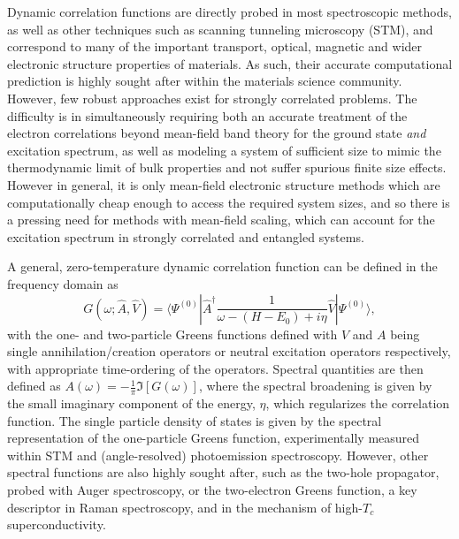 \documentclass[aps,showpacs,twocolumn,nobibnotes]{revtex4}
\begin{document}
Dynamic correlation functions are directly probed in most spectroscopic methods, as well as other techniques such as scanning tunneling microscopy (STM), 
and correspond to many of the important transport, optical, magnetic and wider electronic structure properties of materials. 
As such, their accurate computational prediction is highly sought after within the materials science community. 
However, few robust approaches exist for strongly correlated problems\cite{Gali2013}. The difficulty is in simultaneously requiring both an accurate 
treatment of the electron correlations beyond mean-field band theory for the ground state {\em and} excitation spectrum, as well as modeling 
a system of sufficient size to mimic the thermodynamic limit of bulk properties and not suffer spurious finite size effects. 
However in general, it is only mean-field electronic structure methods which are computationally cheap enough to access the required system
sizes, and so there is a pressing need for methods with mean-field scaling, which can account for the excitation spectrum in strongly correlated 
and entangled systems.

A general, zero-temperature dynamic correlation function can be defined in the frequency domain as
\begin{equation}
    G(\omega;{\hat A},{\hat V}) = \langle \Psi^{(0)} | {\hat A}^{\dagger} \frac{1}{\omega-(H-E_0)+i \eta} {\hat V} | \Psi^{(0)} \rangle , \label{eqn:intCorrFunc}
\end{equation}
with the one- and two-particle Greens functions defined with $V$ and $A$ being single annihilation/creation operators or neutral excitation
operators respectively, with appropriate time-ordering of the operators. Spectral quantities are then defined as $A(\omega)=-\frac{1}{\pi}\Im[G(\omega)]$,
where the spectral broadening is given by the small imaginary component of the energy, $\eta$, which regularizes the correlation function. The single particle
density of states is given by the spectral representation of the one-particle Greens function, experimentally measured within STM 
and (angle-resolved) photoemission spectroscopy. However, other spectral functions are also highly sought after, such as the two-hole propagator, 
probed with Auger spectroscopy\cite{Mona2013}, or the two-electron Greens function, a key descriptor in Raman spectroscopy, and in the 
mechanism of high-$T_c$ superconductivity\cite{Millis2012,Millis2013}.
\end{document}
